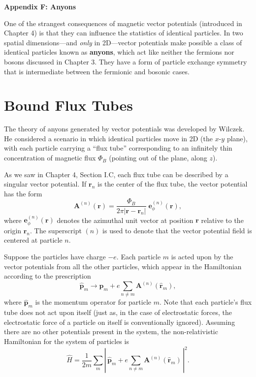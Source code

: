 \documentclass[pra,12pt]{revtex4}
\begin{document}
\begin{center}
{\large \textbf{Appendix F: Anyons}}
\end{center}

One of the strangest consequences of magnetic vector potentials
(introduced in Chapter 4) is that they can influence the statistics of
identical particles.  In two spatial dimensions---and \textit{only} in
2D---vector potentials make possible a class of identical particles
known as \textbf{anyons}, which act like neither the fermions nor
bosons discussed in Chapter 3.  They have a form of particle exchange
symmetry that is intermediate between the fermionic and bosonic cases.

\section{Bound Flux Tubes}

The theory of anyons generated by vector potentials was developed by
Wilczek.  He considered a scenario in which identical particles move
in 2D (the $x$-$y$ plane), with each particle carrying a ``flux tube''
corresponding to an infinitely thin concentration of magnetic flux
$\Phi_B$ (pointing out of the plane, along $z$).

As we saw in Chapter 4, Section I.C, each flux tube can be described
by a singular vector potential.  If $\mathbf{r}_n$ is the center of
the flux tube, the vector potential has the form
\begin{equation}
  \mathbf{A}^{(n)}(\mathbf{r}) = \frac{\Phi_B}{2\pi
    |\mathbf{r}-\mathbf{r}_n|} \; \mathbf{e}_\phi^{(n)}(\mathbf{r}),
  \label{Asolenoid}
\end{equation}
where $\mathbf{e}_\phi^{(n)}(\mathbf{r})$ denotes the azimuthal unit
vector at position $\mathbf{r}$ relative to the origin $\mathbf{r}_n$.
The superscript $(n)$ is used to denote that the vector potential
field is centered at particle $n$.

Suppose the particles have charge $-e$.  Each particle $m$ is acted
upon by the vector potentials from all the other particles, which
appear in the Hamiltonian according to the prescription
\begin{equation}
  \hat{\mathbf{p}}_m \rightarrow \hat{\mathbf{p}}_m
  + e \sum_{n \ne m} \mathbf{A}^{(n)}(\hat{\mathbf{r}}_m),
\end{equation}
where $\hat{\mathbf{p}}_m$ is the momentum operator for particle $m$.
Note that each particle's flux tube does not act upon itself (just as,
in the case of electrostatic forces, the electrostatic force of a
particle on itself is conventionally ignored).  Assuming there are no
other potentials present in the system, the non-relativistic
Hamiltonian for the system of particles is
\begin{equation}
  \hat{H} = \frac{1}{2m} \sum_m \left| \,\hat{\mathbf{p}}_m
  + e \sum_{n \ne m} \mathbf{A}^{(n)}(\hat{\mathbf{r}}_m)\,\right|^2.
\end{equation}
\end{document}
